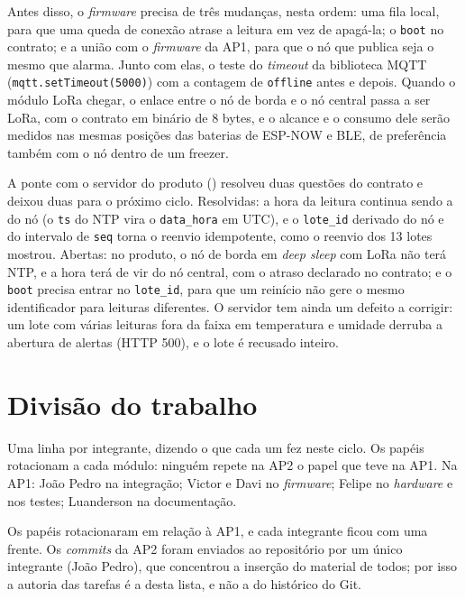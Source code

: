 Antes disso, o \emph{firmware} precisa de três mudanças, nesta ordem:
uma fila local, para que uma queda de conexão atrase a leitura em vez
de apagá-la; o \texttt{boot} no contrato; e a união com o
\emph{firmware} da AP1, para que o nó que publica seja o mesmo que
alarma. Junto com elas, o teste do \emph{timeout} da biblioteca MQTT
(\texttt{mqtt.setTimeout(5000)}) com a contagem de \texttt{offline}
antes e depois. Quando o módulo LoRa chegar, o enlace entre o nó de
borda e o nó central passa a ser LoRa, com o contrato em binário de 8
bytes, e o alcance e o consumo dele serão medidos nas mesmas posições
das baterias de ESP-NOW e BLE, de preferência também com o nó dentro de
um freezer.

A ponte com o servidor do produto () resolveu duas questões do
contrato e deixou duas para o próximo ciclo. Resolvidas: a hora da
leitura continua sendo a do nó (o \texttt{ts} do NTP vira o
\texttt{data\_hora} em UTC), e o \texttt{lote\_id} derivado do nó e do
intervalo de \texttt{seq} torna o reenvio idempotente, como o reenvio dos
13 lotes mostrou. Abertas: no produto, o nó de borda em \emph{deep sleep}
com LoRa não terá NTP, e a hora terá de vir do nó central, com o
atraso declarado no contrato; e o \texttt{boot} precisa entrar no
\texttt{lote\_id}, para que um reinício não gere o mesmo identificador
para leituras diferentes. O servidor tem ainda um defeito a corrigir:
um lote com várias leituras fora da faixa em temperatura e umidade
derruba a abertura de alertas (HTTP 500), e o lote é recusado inteiro.

\section{Divisão do trabalho}

\begin{orientacao}
Uma linha por integrante, dizendo o que cada um fez neste ciclo. Os
papéis rotacionam a cada módulo: ninguém repete na AP2 o papel que teve
na AP1. Na AP1: João Pedro na integração; Victor e Davi no
\emph{firmware}; Felipe no \emph{hardware} e nos testes; Luanderson na
documentação.
\end{orientacao}

Os papéis rotacionaram em relação à AP1, e cada integrante ficou com
uma frente. Os \emph{commits} da AP2 foram enviados ao repositório por
um único integrante (João Pedro), que concentrou a inserção do material
de todos; por isso a autoria das tarefas é a desta lista, e não a do
histórico do Git.


